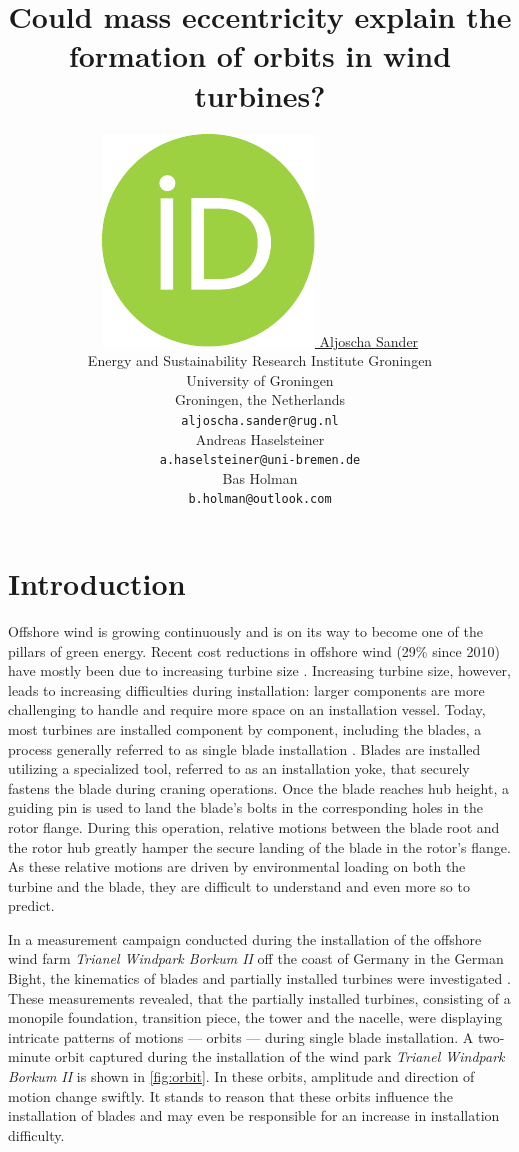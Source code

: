 \documentclass{article}
\title{Could mass eccentricity explain the formation of orbits in wind turbines?}
\author{ \href{https://orcid.org/0000-0001-8717-9688}{\includegraphics[scale=0.06]{orcid.pdf}\hspace{1mm} Aljoscha Sander} \\
	Energy and Sustainability Research Institute Groningen\\
	University of Groningen\\
	Groningen, the Netherlands \\
	\texttt{aljoscha.sander@rug.nl} \\
	\And
	Andreas Haselsteiner \\
	\texttt{a.haselsteiner@uni-bremen.de} \\
	\And
	Bas Holman \\
	\texttt{b.holman@outlook.com}\\
}
\begin{document}
\maketitle

\begin{abstract}
\end{abstract}




\section{Introduction}
\label{sec:introduction}

Offshore wind is growing continuously and is on its way to become one of the pillars of green energy. Recent cost reductions in offshore wind (29\% since 2010) have mostly been due to increasing turbine size \citep{irenaRenewablePowerGeneration2020}. Increasing turbine size, however, leads to increasing difficulties during installation: larger components are more challenging to handle and require more space on an installation vessel. Today, most turbines are installed component by component, including the blades, a process generally referred to as single blade installation \citep{jiangInstallationOffshoreWind2021}. Blades are installed utilizing a specialized tool, referred to as an installation yoke, that securely fastens the blade during craning operations. Once the blade reaches hub height, a guiding pin is used to land the blade's bolts in the corresponding holes in the rotor flange. During this operation, relative motions between the blade root and the rotor hub greatly hamper the secure landing of the blade in the rotor's flange. As these relative motions are driven by environmental loading on both the turbine and the blade, they are difficult to understand and even more so to predict. 

In a measurement campaign conducted during the installation of the offshore wind farm \textit{Trianel Windpark Borkum II} off the coast of Germany in the German Bight, the kinematics of blades and partially installed turbines were investigated \citep{sanderRelativeMotionSingle2020,  sanderMONITORINGOFFSHOREWIND2020, sanderOscillationsOffshoreWind2020}. These measurements revealed, that the partially installed turbines, consisting of a monopile foundation, transition piece, the tower and the nacelle, were displaying intricate patterns of motions — orbits — during single blade installation. A two-minute orbit captured during the installation of the wind park \textit{Trianel Windpark Borkum II} is shown in \autoref{fig:orbit}. In these orbits, amplitude and direction of motion change swiftly. It stands to reason that these orbits influence the installation of blades and may even be responsible for an increase in installation difficulty.
\end{document}
